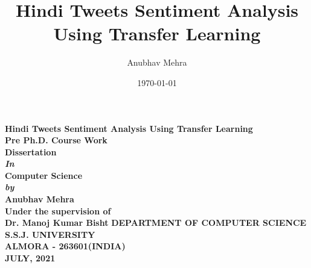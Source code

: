 \documentclass[a4paper, 12pt]{article}
\title{Hindi Tweets Sentiment Analysis Using Transfer Learning}
\author{Anubhav Mehra}
\date{\today}
\begin{document}
\begin{titlepage}
	\begin{center}
		\vspace*{1cm}
			\Large{\textbf{Hindi Tweets Sentiment Analysis Using Transfer Learning}}\\
			\vspace*{3cm}
			\large{\textbf{Pre Ph.D. Course Work \\ Dissertation}}\\ [1cm]
			\large{\textbf{\textit{In}}}\\[1cm]
			\large{\textbf{Computer Science}}\\ [1cm]
			\large{\textit{\textbf{by}}} \\[1cm]
			\large{\textbf{Anubhav Mehra}}\\
			\vspace*{1cm}
			\large{\textbf{Under the supervision of}}\\
			\large{\textbf{Dr. Manoj Kumar Bisht}}
			\vfill
			\Large{\textbf{DEPARTMENT OF COMPUTER SCIENCE \\ S.S.J. UNIVERSITY \\ ALMORA - 263601(INDIA) \\ JULY, 2021}}
			
			\normalsize
			
	\end{center}
\end{titlepage}
\end{document}

